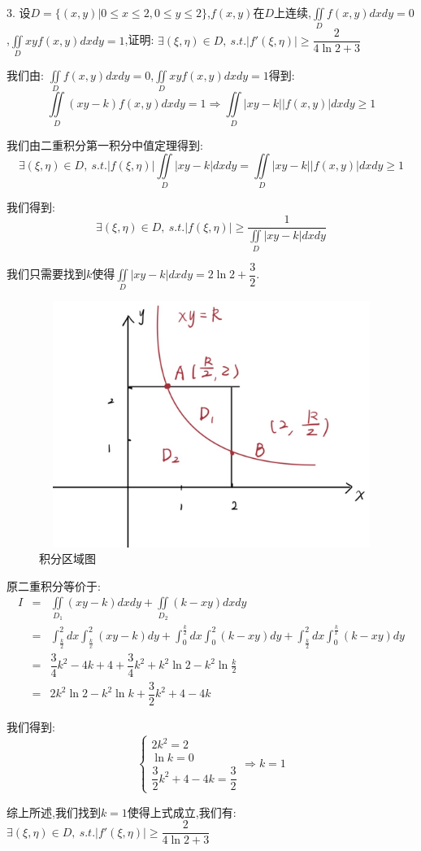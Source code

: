 3. 设$D=\{(x,y)|0\leq x\leq 2,0\leq y\leq 2\}$,$f(x,y)$在$D$上连续,$\iint\limits_{D}f(x,y)dxdy=0$,$\iint\limits_{D}xyf(x,y)dxdy=1$,证明: $\exists (\xi,\eta)\in D,\ s.t. |f'(\xi,\eta)|\geq \dfrac{2}{4\ln 2+3}$
\begin{solution}
	
	我们由: $\iint\limits_{D}f(x,y)dxdy=0$,$\iint\limits_{D}xyf(x,y)dxdy=1$得到: 
	$$\iint\limits_{D}(xy-k)f(x,y)dxdy=1\Rightarrow \iint\limits_{D}|xy-k||f(x,y)|dxdy\geq 1$$
	
	我们由二重积分第一积分中值定理得到: 
	$$\exists (\xi,\eta)\in D, \ s.t. |f(\xi,\eta)|\iint\limits_{D}|xy-k|dxdy=\iint\limits_{D}|xy-k||f(x,y)|dxdy\geq 1$$
	
	我们得到: 
	$$\exists (\xi,\eta)\in D, \ s.t. |f(\xi,\eta)|\geq \dfrac{1}{\iint\limits_{D}|xy-k|dxdy}$$
	
	我们只需要找到$k$使得$\iint\limits_{D}|xy-k|dxdy=2\ln2+\dfrac{3}{2}$.
	\begin{figure}[htbp]
		\centering
		\includegraphics[width=15cm,height=8cm]{"figure/Question/积分区域.jpg"}
		\caption{积分区域图}
		\label{积分区域图}
	\end{figure} 
	
	原二重积分等价于: 
	\begin{eqnarray*}
		I&=&\iint\limits_{D_{1}}(xy-k)dxdy+\iint\limits_{D_{2}}(k-xy)dxdy\\
		&=&\int_{\frac{k}{2}}^{2}dx\int_{\frac{k}{x}}^{2}(xy-k)dy+\int_{0}^{\frac{k}{2}}dx\int_{0}^{2}(k-xy)dy+\int_{\frac{k}{2}}^{2}dx\int_{0}^{\frac{k}{x}}(k-xy)dy\\
		&=&\dfrac{3}{4}k^2-4k+4+\dfrac{3}{4}k^2+k^2\ln 2-k^2\ln \frac{k}{2}\\
		&=&2k^2\ln 2-k^2\ln k+\dfrac{3}{2}k^2+4-4k
	\end{eqnarray*}
	
	我们得到: 
	$$\left\lbrace
	\begin{array}{l}
		2k^2=2\\
		\ln k=0\\
		\dfrac{3}{2}k^2+4-4k=\dfrac{3}{2}
	\end{array}
	\right. \Rightarrow k=1$$
	
	综上所述,我们找到$k=1$使得上式成立,我们有: $\exists (\xi,\eta)\in D,\ s.t. |f'(\xi,\eta)|\geq \dfrac{2}{4\ln 2+3}$
\end{solution}


